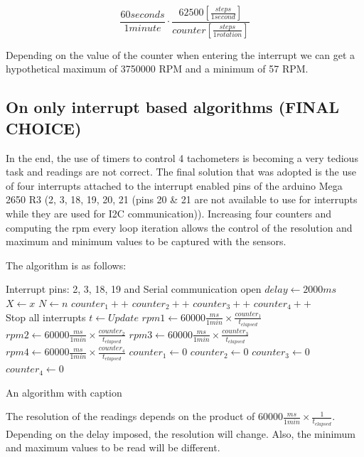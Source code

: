 \documentclass[a4paper]{article}
\begin{document}
\begin{equation}
	\frac{60seconds}{1minute}\cdot\frac{62500 [\frac{steps}{1second}]}{counter [\frac{steps}{1rotation}]}
\end{equation}

Depending on the value of the counter when entering the interrupt we can get a hypothetical maximum of 3750000 RPM and a minimum of 57 RPM.

\subsection{On only interrupt based algorithms (FINAL CHOICE)}

In the end, the use of timers to control 4 tachometers is becoming a very tedious task and readings are not correct. The final solution that was adopted is the use of four interrupts attached to the interrupt enabled pins of the arduino Mega 2650 R3 (2, 3, 18, 19, 20, 21 (pins 20 \& 21 are not available to use for interrupts while they are used for I2C communication)). Increasing four counters and computing the rpm every loop iteration allows the control of the resolution and maximum and minimum values to be captured with the sensors.

The algorithm is as follows:

\begin{algorithm}
	\begin{algorithmic}
		\Ensure Interrupt pins: 2, 3, 18, 19 and Serial communication open
		\State $delay \gets 2000ms$
		\State $X \gets x$
		\State $N \gets n$
		\State $counter_1  ++ $
		\State $counter_2  ++ $  
		\State $counter_3  ++ $
		\State $counter_4  ++ $
		\EndFor
		\\Stop all interrupts 
		\State $t \gets Update  $
		\State $rpm1 \gets 60000\frac{ms}{1min} \times \frac{counter_1}{t_{elapsed}} $
		\State $rpm2 \gets 60000\frac{ms}{1min} \times \frac{counter_2}{t_{elapsed}} $
		\State $rpm3 \gets 60000\frac{ms}{1min} \times \frac{counter_3}{t_{elapsed}} $
		\State $rpm4 \gets 60000\frac{ms}{1min} \times \frac{counter_4}{t_{elapsed}} $
		\State $counter_1  \gets 0 $
		\State $counter_2  \gets 0$  
		\State $counter_3  \gets 0 $
		\State $counter_4  \gets 0 $
		\EndWhile
	\end{algorithmic}
\caption{An algorithm with caption}
\label{alg:cap}
\end{algorithm}

The resolution of the readings depends on the product of $60000\frac{ms}{1min} \times \frac{1}{t_{elapsed}}$. Depending on the delay imposed, the resolution will change. Also, the minimum and maximum values to be read will be different.
\end{document}
